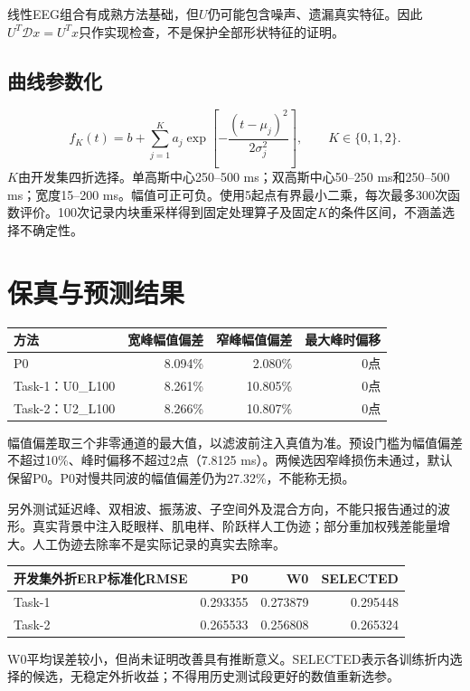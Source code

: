\documentclass[UTF8,a4paper,11pt,fontset=fandol]{ctexart}
\begin{document}
线性EEG组合有成熟方法基础\cite{parra2005linear}，但$U$仍可能包含噪声、遗漏真实特征。因此$U^T\mathcal D x=U^Tx$只作实现检查，不是保护全部形状特征的证明。

\subsection{曲线参数化}
\[
f_K(t)=b+\sum_{j=1}^{K}a_j\exp\left[-\frac{(t-\mu_j)^2}{2\sigma_j^2}\right],
\qquad K\in\{0,1,2\}.
\]
$K$由开发集四折选择。单高斯中心250--500 ms；双高斯中心50--250 ms和250--500 ms；宽度15--200 ms。幅值可正可负。使用5起点有界最小二乘，每次最多300次函数评价。100次记录内块重采样得到固定处理算子及固定$K$的条件区间，不涵盖选择不确定性。

\section{保真与预测结果}
\begin{center}
\begin{tabular}{lrrr}
\toprule
方法 & 宽峰幅值偏差 & 窄峰幅值偏差 & 最大峰时偏移\\
\midrule
P0 & 8.094\% & 2.080\% & 0点\\
Task-1：U0\_L100 & 8.261\% & 10.805\% & 0点\\
Task-2：U2\_L100 & 8.266\% & 10.807\% & 0点\\
\bottomrule
\end{tabular}
\end{center}
幅值偏差取三个非零通道的最大值，以滤波前注入真值为准。预设门槛为幅值偏差不超过10\%、峰时偏移不超过2点（7.8125 ms）。两候选因窄峰损伤未通过，默认保留P0。P0对慢共同波的幅值偏差仍为27.32\%，不能称无损。

另外测试延迟峰、双相波、振荡波、子空间外及混合方向，不能只报告通过的波形。真实背景中注入眨眼样、肌电样、阶跃样人工伪迹；部分重加权残差能量增大。人工伪迹去除率不是实际记录的真实去除率。

\begin{center}
\begin{tabular}{lrrr}
\toprule
开发集外折ERP标准化RMSE & P0 & W0 & SELECTED\\
\midrule
Task-1 & 0.293355 & 0.273879 & 0.295448\\
Task-2 & 0.265533 & 0.256808 & 0.265324\\
\bottomrule
\end{tabular}
\end{center}
W0平均误差较小，但尚未证明改善具有推断意义。SELECTED表示各训练折内选择的候选，无稳定外折收益；不得用历史测试段更好的数值重新选参。
\end{document}
